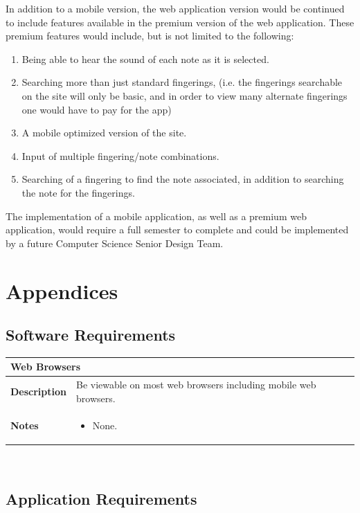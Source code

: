 \documentclass[12pt,english]{article}
\providecommand{\tabularnewline}{\\}
\providecommand{\tabularnewline}{\\}
\begin{document}
In addition to a mobile version, the web application version would
be continued to include features available in the premium version
of the web application. These premium features would include, but
is not limited to the following:
\begin{enumerate}
\item Being able to hear the sound of each note as it is selected. 
\item Searching more than just standard fingerings, (i.e. the fingerings
searchable on the site will only be basic, and in order to view many
alternate fingerings one would have to pay for the app) 
\item A mobile optimized version of the site. 
\item Input of multiple fingering/note combinations. 
\item Searching of a fingering to find the note associated, in addition
to searching the note for the fingerings. 
\end{enumerate}
The implementation of a mobile application, as well as a premium web
application, would require a full semester to complete and could be
implemented by a future Computer Science Senior Design Team. \clearpage{}


\section{Appendices}


\subsection{Software Requirements}

\begin{tabular}{|p{3cm}|p{13cm}|}
\hline 
\multicolumn{2}{|l|}{\textbf{Web Browsers}}\tabularnewline
\hline 
\textbf{Description}  & Be viewable on most web browsers including mobile web browsers. \tabularnewline
\hline 
\textbf{Notes}  & \begin{itemize}
\item None. \end{itemize}
\tabularnewline
\hline 
\end{tabular}\\[0.5cm]


\subsection{Application Requirements}
\end{document}

